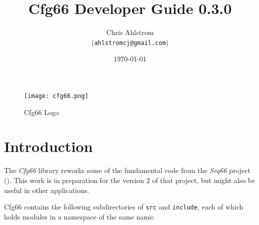 \documentclass[
 11pt,
 twoside,
 a4paper,
 final                                 %
]{article}
\begin{document}
\title{Cfg66 Developer Guide 0.3.0}
\author{Chris Ahlstrom \\
   (\texttt{ahlstromcj@gmail.com})}
\date{\today}
\maketitle

\begin{figure}[H]
   \centering 
   \texttt{[image: cfg66.png]}
   \caption*{Cfg66 Logo}
\end{figure}

\clearpage                             %

\tableofcontents
\listoffigures                         %
\listoftables                          %


\setlength{\parindent}{2em}
\setlength{\parskip}{1ex plus 0.5ex minus 0.2ex}

\rhead{\rightmark}         %

\section{Introduction}
\label{sec:introduction}

   The \textsl{Cfg66} library reworks some of the fundamental code
   from the \textsl{Seq66} project (\cite{seq66}).
   This work is in preparation for the version 2 of that project, but
   might also be useful in other applications.

   Cfg66 contains the following subdirectories of \texttt{src} and
   \texttt{include}, each of which holds modules in a
   namespace of the same name:
\end{document}
